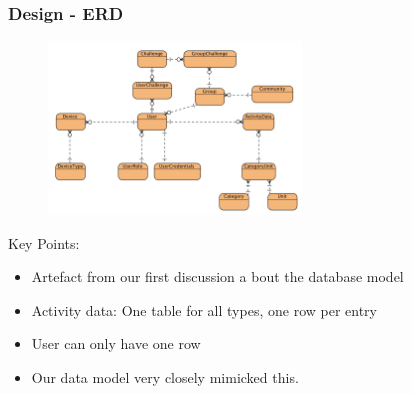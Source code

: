 \documentclass[10pt, compress]{beamer}
\begin{document}
\begin{frame}[fragile]
  \frametitle{Design - ERD}
  
  
    	   \begin{figure}
  \begin{center}
    \includegraphics[width=0.6\textwidth]{../design/database/GoAber-ERD.png}
  \end{center}
  \end{figure}
  
  	Key Points:
  
  	\begin{itemize}
		\item Artefact from our first discussion a bout the database model
	   	\item Activity data: One table for all types, one row per entry
	   	\item User can only have one row
	   	\item Our data model very closely mimicked this.
	\end{itemize}
     

\end{frame}


\end{document}
